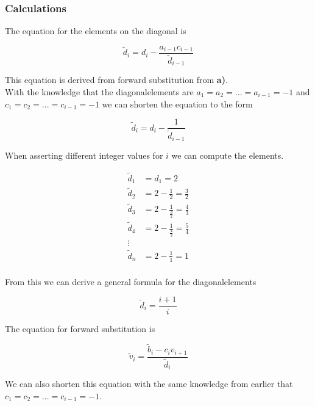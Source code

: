 \documentclass{article}
\begin{document}
    \subsubsection{Calculations}

    The equation for the elements on the diagonal is

    \begin{equation*}
      \tilde{d}_i = d_i - \frac{a_{i-1} c_{i-1}}{\tilde{d}_{i-1}}
    \end{equation*}

    This equation is derived from forward substitution from \textbf{a)}. \\

    With the knowledge that the diagonalelements are $a_1 = a_2 = ... = a_{i-1} = -1 $ and $c_1 = c_2 = ... = c_{i-1} = -1$ we can shorten the equation to the form

    \begin{equation*}
      \tilde{d}_i = d_i - \frac{1}{\tilde{d}_{i-1}}
    \end{equation*}

    When asserting different integer values for $i$ we can compute the elements.

    \begin{align*}
      \tilde{d}_1 &= d_1 = 2 \\
      \tilde{d}_2 &= 2 - \frac{1}{2} = \frac{3}{2} \\
      \tilde{d}_3 &= 2 - \frac{1}{\frac{3}{2}} = \frac{4}{3} \\
      \tilde{d}_4 &= 2 - \frac{1}{\frac{4}{3}} = \frac{5}{4} \\
      \vdots \\
      \tilde{d}_n &= 2 - \frac{1}{1} = 1 \\
    \end{align*}

    From this we can derive a general formula for the diagonalelements

    \begin{equation*}
      \tilde{d}_i = \frac{i+1}{i}
    \end{equation*}

    The equation for forward substitution is

    \begin{equation*}
      \tilde{v}_i = \frac{\tilde{b}_i - c_i v_{i+1}}{\tilde{d}_i}
    \end{equation*}

    We can also shorten this equation with the same knowledge from earlier that $c_1 = c_2 = ... = c_{i-1} = -1$.
\end{document}
